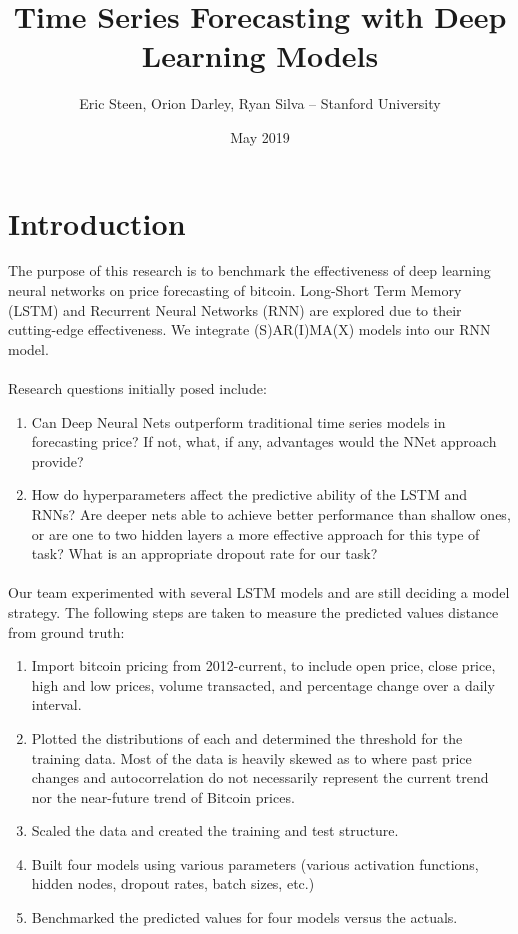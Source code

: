 \documentclass{article}
\title{Time Series Forecasting with Deep Learning Models}
\author{Eric Steen, Orion Darley, Ryan Silva – Stanford University }
\date{May 2019}
\begin{document}
\maketitle

\section{Introduction}
The purpose of this research is to benchmark the effectiveness of deep learning neural networks on price forecasting of bitcoin. Long-Short Term Memory (LSTM) and Recurrent Neural Networks (RNN) are explored due to their cutting-edge effectiveness. We integrate (S)AR(I)MA(X) models into our RNN model.

\paragraph{}
Research questions initially posed include:
\begin{enumerate}
    \item Can Deep Neural Nets outperform traditional time series models in forecasting price? If not, what, if any, advantages would the NNet approach provide?
    \item How do hyperparameters affect the predictive ability of the LSTM and RNNs? Are deeper nets able to achieve better performance than shallow ones, or are one to two hidden layers a more effective approach for this type of task? What is an appropriate dropout rate for our task?
\end{enumerate}

\paragraph{}
Our team experimented with several LSTM models and are still deciding a model strategy. The following steps are taken to measure the predicted values distance from ground truth:

\begin{enumerate}
\item Import bitcoin pricing from 2012-current, to include open price, close price, high and low prices, volume transacted, and percentage change over a daily interval.
\item Plotted the distributions of each and determined the threshold for the training data. Most of the data is heavily skewed as to where past price changes and autocorrelation do not necessarily represent the current trend nor the near-future trend of Bitcoin prices.
\item Scaled the data and created the training and test structure.
\item Built four models using various parameters (various activation functions, hidden nodes, dropout rates, batch sizes, etc.)
\item Benchmarked the predicted values for four models versus the actuals.
\end{enumerate}
\end{document}
